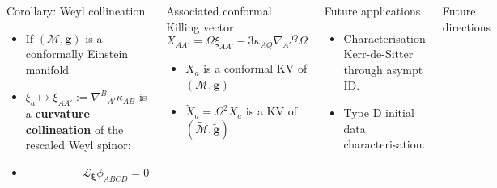 \documentclass[10pt]{beamer}
\theoremstyle{plain}
\def\bmg{{\bm g}}
\begin{document}
\begin{frame}
  \begin{columns}
    \column{6.0cm}
    \vspace{-4mm}
    \begin{exampleblock}{Corollary: Weyl collineation}
      \begin{itemize}
       \item  If $(\mathcal{M},\bmg)$ is a conformally Einstein manifold
       \item $\xi_{a} \mapsto \xi_{AA'}:= \nabla^{B}{}_{A'}\kappa_{AB}$ is a
         \textbf{curvature collineation} of the rescaled Weyl spinor:
      \item $\qquad \qquad \quad \mathcal{L}_{\bm\xi}\phi_{ABCD}=0$
      \end{itemize}
    \end{exampleblock}
    \vspace{-3mm}
    \begin{block}{Associated conformal Killing vector}
      \vspace{-3mm}
      \begin{equation*}\label{eq:conformalKillingVector}
  X_{AA'}=\Omega \xi_{AA'} - 3 \kappa_{AQ}\nabla_{A'}{}^{Q}\Omega
      \end{equation*}
      \vspace{-5mm}
      \begin{itemize}
\item $X_a$ is a conformal KV of $(\mathcal{M},\bmg)$
\item $\tilde{X}_a=\Omega^{2}X_{a}$ is a KV of $(\tilde{\mathcal{M}},\tilde{\bmg})$
      \end{itemize}
      \pause
    \end{block}
    \begin{exampleblock}{Future applications}
      \begin{itemize}
    \item  Characterisation Kerr-de-Sitter through asympt ID.
    \item  Type D initial data characterisation.
      \end{itemize}
     \end{exampleblock}
    \column{4cm}
     \begin{block}{Future directions}
       \begin{itemize}
         

\end{itemize}
\end{block}
\end{columns}
\end{frame}
\end{document}
